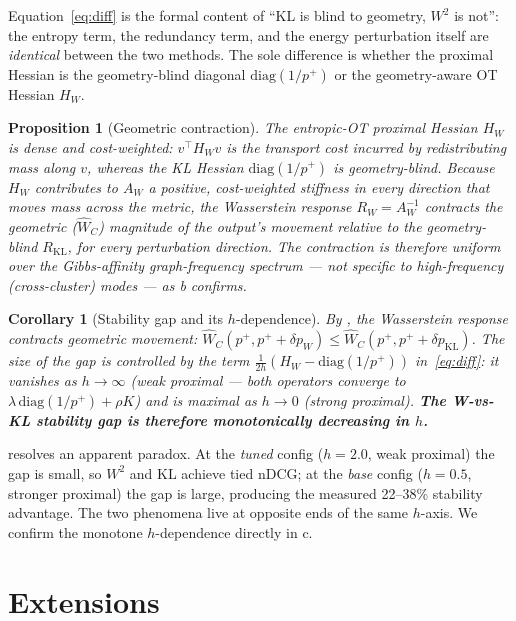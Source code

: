\documentclass{article}
\theoremstyle{plain}
\newtheorem{proposition}{Proposition}
\newtheorem{corollary}{Corollary}
\newcommand{\mWdist}{\widehat{W}_C}
\begin{document}
Equation~\eqref{eq:diff} is the formal content of ``KL is blind to geometry, $W^2$ is not'': the entropy term, the redundancy term, and the energy perturbation itself are \emph{identical} between the two methods. The sole difference is whether the proximal Hessian is the geometry-blind diagonal $\mathrm{diag}(1/p^+)$ or the geometry-aware OT Hessian $H_W$.

\begin{proposition}[Geometric contraction]
\label{prop:curvature}
The entropic-OT proximal Hessian $H_W$ is dense and cost-weighted: $v^\top H_W v$ is the transport cost incurred by redistributing mass along $v$, whereas the KL Hessian $\mathrm{diag}(1/p^+)$ is geometry-blind. Because $H_W$ contributes to $A_W$ a positive, cost-weighted stiffness in every direction that moves mass across the metric, the Wasserstein response $R_W=A_W^{-1}$ contracts the \emph{geometric} ($\mWdist$) magnitude of the output's movement relative to the geometry-blind $R_{\mathrm{KL}}$, for every perturbation direction. The contraction is therefore uniform over the Gibbs-affinity graph-frequency spectrum --- not specific to high-frequency (cross-cluster) modes --- as b confirms.
\end{proposition}

\begin{corollary}[Stability gap and its $h$-dependence]
\label{cor:hdep}
By , the Wasserstein response contracts geometric movement: $\mWdist(p^+,p^+{+}\delta p_W)\le\mWdist(p^+,p^+{+}\delta p_{\mathrm{KL}})$. The size of the gap is controlled by the term $\tfrac{1}{2h}(H_W-\mathrm{diag}(1/p^+))$ in~\eqref{eq:diff}: it vanishes as $h\to\infty$ (weak proximal --- both operators converge to $\lambda\,\mathrm{diag}(1/p^+)+\rho K$) and is maximal as $h\to0$ (strong proximal). \textbf{The W-vs-KL stability gap is therefore monotonically decreasing in $h$.}
\end{corollary}

 resolves an apparent paradox. At the \emph{tuned} config ($h{=}2.0$, weak proximal) the gap is small, so $W^2$ and KL achieve tied nDCG; at the \emph{base} config ($h{=}0.5$, stronger proximal) the gap is large, producing the measured 22--38\% stability advantage. The two phenomena live at opposite ends of the same $h$-axis. We confirm the monotone $h$-dependence directly in c.


\section{Extensions}
\label{sec:contributions}
\end{document}
